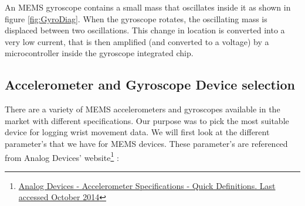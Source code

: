 An MEMS gyroscope contains a small mass that oscillates inside it as shown in figure \ref{fig:GyroDiag}. When the gyroscope rotates, the oscillating mass is displaced between two oscillations. This change in location is converted into a very low current, that is then amplified (and converted to a voltage) by a microcontroller inside the gyroscope integrated chip.

\subsection{Accelerometer and Gyroscope Device selection}
There are a variety of MEMS accelerometers and gyroscopes available in the market with different specifications. Our purpose was to pick the most suitable device for logging wrist movement data. We will first look at the different parameter's that we have for MEMS devices. These parameter's are referenced from Analog Devices' website\footnote{\href{http://www.analog.com/en/content/td_accelerometer_specifications_definitions/fca.html}{Analog Devices - Accelerometer Specifications - Quick Definitions. Last accessed October 2014}} :

